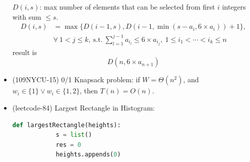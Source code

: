 \begin{itemize}
    $D(i, s)$: max number of elements that can be selected from first $i$ integers with sum $\le s$. \begin{equation}
        \begin{aligned}
            D(i, s) & = \max\{D(i - 1, s), D(i - 1, \min(s - a_i, 6 \times a_i)) + 1\}, \\
            & \forall \ 1 < j \le k, \ \text{s.t.} \ \sum_{l = 1}^{j - 1}a_{i_l} \le 6 \times a_{i_j}, \ 1 \le i_1 < \cdots < i_k \le n
        \end{aligned}
    \end{equation} result is \begin{equation}
        D(n, 6 \times a_{n + 1})
    \end{equation}
    \item (109NYCU-15) 0/1 Knapsack problem: if $W = \Theta(n^2)$, and $w_i \in \{1\} \lor w_i \in \{1, 2\}$, then $T(n) = O(n)$.
    \item (leetcode-84) Largest Rectangle in Histogram: \begin{lstlisting}[caption={Largest Rectangle in Histogram.}, captionpos=b, language=Python]
        def largestRectangle(heights):
            s = list()
            res = 0
            heights.appends(0)
            

\end{lstlisting}
\end{itemize}

